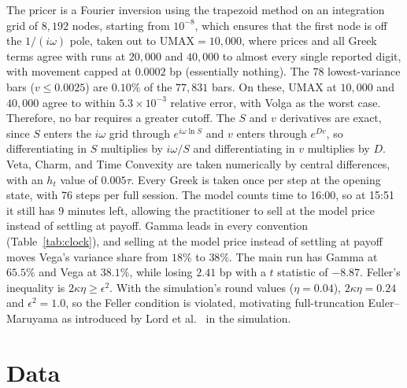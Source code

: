 \documentclass[11pt]{article}
\begin{document}
The pricer is a Fourier inversion using the trapezoid method on an integration grid of $8{,}192$ nodes, starting from $10^{-8}$, which ensures that the first node is off the $1/(i\omega)$ pole, taken out to $\mathrm{UMAX} = 10{,}000$, where prices and all Greek terms agree with runs at $20{,}000$ and $40{,}000$ to almost every single reported digit, with movement capped at $0.0002$ bp (essentially nothing).
The 78 lowest-variance bars ($v \le 0.0025$) are $0.10\%$ of the $77{,}831$ bars. On these, UMAX at $10{,}000$ and $40{,}000$ agree to within $5.3\times10^{-3}$ relative error, with Volga as the worst case. Therefore, no bar requires a greater cutoff.
The $S$ and $v$ derivatives are exact, since $S$ enters the $i\omega$ grid through $e^{i\omega \ln S}$ and $v$ enters through $e^{Dv}$, so differentiating in $S$ multiplies by $i\omega/S$ and differentiating in $v$ multiplies by $D$.
Veta, Charm, and Time Convexity are taken numerically by central differences, with an $h_t$ value of $0.005\tau$.
Every Greek is taken once per step at the opening state, with $76$ steps per full session.
The model counts time to 16:00, so at 15:51 it still has 9 minutes left, allowing the practitioner to sell at the model price instead of settling at payoff.
Gamma leads in every convention (Table~\ref{tab:clock}), and selling at the model price instead of settling at payoff moves Vega's variance share from $18\%$ to $38\%$. The main run has Gamma at $65.5\%$ and Vega at $38.1\%$, while losing $2.41$ bp with a $t$ statistic of $-8.87$.
Feller's inequality is $2\kappa \eta \ge \epsilon^2$.
With the simulation's round values ($\eta = 0.04$), $2\kappa \eta = 0.24$ and $\epsilon^2 = 1.0$, so the Feller condition is violated, motivating full-truncation Euler--Maruyama as introduced by Lord et al.\ \cite{lord2010} in the simulation.



\section{Data}
\label{sec:data}
\end{document}
